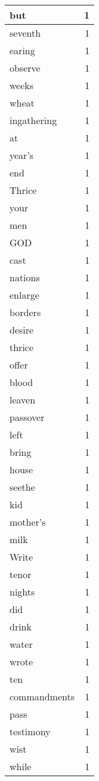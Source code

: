 \begin{center}
\begin{longtable}{l|r}
but & 1 \\ \hline
seventh & 1 \\ \hline
earing & 1 \\ \hline
observe & 1 \\ \hline
weeks & 1 \\ \hline
wheat & 1 \\ \hline
ingathering & 1 \\ \hline
at & 1 \\ \hline
year's & 1 \\ \hline
end & 1 \\ \hline
Thrice & 1 \\ \hline
your & 1 \\ \hline
men & 1 \\ \hline
GOD & 1 \\ \hline
cast & 1 \\ \hline
nations & 1 \\ \hline
enlarge & 1 \\ \hline
borders & 1 \\ \hline
desire & 1 \\ \hline
thrice & 1 \\ \hline
offer & 1 \\ \hline
blood & 1 \\ \hline
leaven & 1 \\ \hline
passover & 1 \\ \hline
left & 1 \\ \hline
bring & 1 \\ \hline
house & 1 \\ \hline
seethe & 1 \\ \hline
kid & 1 \\ \hline
mother's & 1 \\ \hline
milk & 1 \\ \hline
Write & 1 \\ \hline
tenor & 1 \\ \hline
nights & 1 \\ \hline
did & 1 \\ \hline
drink & 1 \\ \hline
water & 1 \\ \hline
wrote & 1 \\ \hline
ten & 1 \\ \hline
commandments & 1 \\ \hline
pass & 1 \\ \hline
testimony & 1 \\ \hline
wist & 1 \\ \hline
while & 1 \\ \hline

\end{longtable}
\end{center}
